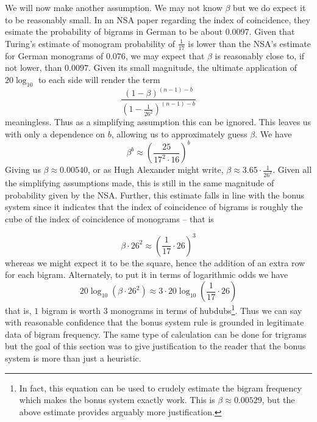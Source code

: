 \noindent We will now make another assumption. We may not know
$\beta$ but we do expect it to be reasonably small. In an NSA paper
regarding the index of coincidence, they esimate the probability of
bigrams in German to be about $0.0097$. Given that Turing's
estimate of monogram probability of $\frac{1}{17}$ is lower than
the NSA's estimate for German monograms of $0.076$, we may expect
that $\beta$ is reasonably close to, if not lower, than $0.0097$.
Given its small magnitude, the ultimate application of
$20\log_{10}$ to each side will render the term
\[
	\frac{(1-\beta)^{(n-1)-b}}{(1-\frac{1}{26^2})^{(n-1)-b}}
\]
meaningless. Thus as a simplifying assumption this can be ignored.
This leaves us with only a dependence on $b$, allowing us to
approximately guess $\beta$. We have
\[
	\beta^b \approx
	(\frac{25}{17^2\cdot16})^b
\]
Giving us $\beta \approx 0.00540$, or as Hugh Alexander might
write, $\beta \approx 3.65\cdot\frac{1}{26^2}$. Given all the
simplifying assumptions made, this is still in the same magnitude
of probability given by the NSA. Further, this estimate falls in
line with the bonus system since it indicates that the index of
coincidence of bigrams is roughly the cube of the index of
coincidence of monograms -- that is

\[
	\beta\cdot26^2 \approx (\frac{1}{17}\cdot26)^3
\]
whereas we might expect it to be the square, hence the addition of
an extra row for each bigram. Alternately, to put it in terms of
logarithmic odds we have
\[
	20\log_{10}(\beta\cdot26^2) \approx 3\cdot20\log_{10}(\frac{1}{17}\cdot26)
\]
that is, $1$ bigram is worth $3$ monograms in terms of
hubdubs\footnote{In fact, this equation can be used to crudely
	estimate the bigram frequency which makes the bonus system exactly
	work. This is $\beta\approx0.00529$, but the above estimate
	provides arguably more justification.}. Thus we can say with reasonable
confidence that the bonus system rule is grounded in legitimate
data of bigram frequency. The same type of calculation can be done
for trigrams but the goal of this section was to give justification
to the reader that the bonus system is more than just a heuristic.


